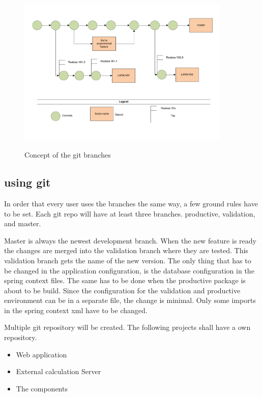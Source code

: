 \documentclass[paper=a4,twoside=false,BCOR=0mm,DIV=calc,fontsize=12pt]{scrartcl}
\begin{document}
\begin{figure}
    \begin{center}
       \includegraphics[width=0.9\textwidth]{./img/gitversioning.pdf}\\
    \end{center}
  \caption{Concept of the git branches}
  \label{gitbranchconcept}
\end{figure} 

\subsection{using git}
In order that every user uses the branches the same way, a few ground rules have to be set.
Each git repo will have at least three branches. productive, validation, and master.

Master is always the newest development branch. When the new feature is ready the changes are merged into the validation branch where they are tested. This validation branch gets the name of the new version.
The only thing that has to be changed in the application configuration, is the database configuration in the spring context files.
The same has to be done when the productive package is about to be build. Since the configuration for the validation and productive 
environment can be in a separate file, the change is minimal. Only some imports in the spring context xml have to be changed.

Multiple git repository will be created. The following projects shall have a own repository.
\begin{itemize}
 \item Web application
 \item External calculation Server
 \item The components
\end{itemize}
\end{document}
